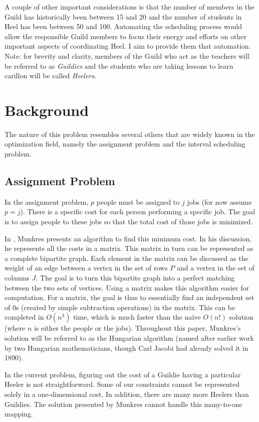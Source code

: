\documentclass[letterpaper]{article}
\begin{document}
A couple of other important considerations is that the number of members in the Guild has historically been between 15
and 20 and the number of students in Heel has been between 50 and 100. Automating the scheduling process would allow the
responsible Guild members to focus their energy and efforts on other important aspects of coordinating Heel. I aim to
provide them that automation. Note: for brevity and clarity, members of the Guild who act as the teachers will be referred to
as \textit{Guildies} and the students who are taking lessons to learn carillon will be called \textit{Heelers}.

\section{Background} 
The nature of this problem resembles several others that are widely known in the optimization field, namely the assignment
problem and the interval scheduling problem.

\subsection{Assignment Problem}
In the assignment problem, $p$ people must be assigned to $j$ jobs (for now assume $p = j$). There is a specific cost for
each person performing a specific job. The goal is to assign people to these jobs so that the total cost of those jobs
is minimized. 

In \cite{munkres}, Munkres presents an algorithm to find this minimum cost. In his discussion, he represents all the
costs in a matrix. This matrix in turn can be represented as a complete bipartite graph. Each element in the matrix can
be discussed as the weight of an edge between a vertex in the set of rows $P$ and a vertex in the set of columns $J$.
The goal is to turn this bipartite graph into a perfect matching between the two sets of vertices. Using a matrix makes
this algorithm easier for computation. For a matrix, the goal is thus to essentially find an independent set of 0s
(created by simple subtraction operations) in the matrix. This can be completed in $O(n^3)$ time, which is much faster
than the na{\"i}ve $O(n!)$ solution (where $n$ is either the people or the jobs). Throughout this paper, Munkres's
solution will be referred to as the Hungarian algorithm (named after earlier work by two Hungarian mathematicians,
though Carl Jacobi had already solved it in 1890).

In the current problem, figuring out the cost of a Guildie having a particular Heeler is not straightforward. Some of
our constraints cannot be represented solely in a one-dimensional cost. In addition, there are many more Heelers than
Guildies. The solution presented by Munkres cannot handle this many-to-one mapping.
\end{document}
